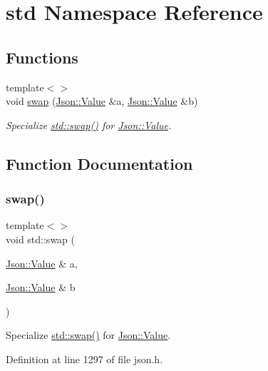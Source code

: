 \hypertarget{namespacestd}{}\section{std Namespace Reference}
\label{namespacestd}
\subsection*{Functions}
\begin{DoxyCompactItemize}
\item 
{\footnotesize template$<$$>$ }\\void \hyperlink{namespacestd_a22cc6fcbbb1f2f705c7888b615e43582}{swap} (\hyperlink{class_json_1_1_value}{Json\+::\+Value} \&a, \hyperlink{class_json_1_1_value}{Json\+::\+Value} \&b)
\begin{DoxyCompactList}\small\item\em Specialize \hyperlink{namespacestd_a22cc6fcbbb1f2f705c7888b615e43582}{std\+::swap()} for \hyperlink{class_json_1_1_value}{Json\+::\+Value}. \end{DoxyCompactList}\end{DoxyCompactItemize}


\subsection{Function Documentation}
\hypertarget{namespacestd_a22cc6fcbbb1f2f705c7888b615e43582}{}\label{namespacestd_a22cc6fcbbb1f2f705c7888b615e43582} 
\subsubsection{\texorpdfstring{swap()}{swap()}}
{\footnotesize\ttfamily template$<$$>$ \\
void std\+::swap (\begin{DoxyParamCaption}\item[{\hyperlink{class_json_1_1_value}{Json\+::\+Value} \&}]{a,  }\item[{\hyperlink{class_json_1_1_value}{Json\+::\+Value} \&}]{b }\end{DoxyParamCaption})\hspace{0.3cm}{\ttfamily [inline]}}



Specialize \hyperlink{namespacestd_a22cc6fcbbb1f2f705c7888b615e43582}{std\+::swap()} for \hyperlink{class_json_1_1_value}{Json\+::\+Value}. 



Definition at line 1297 of file json.\+h.


